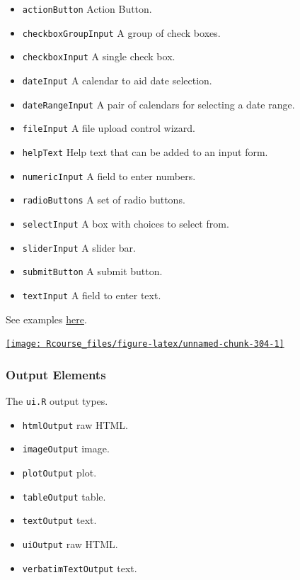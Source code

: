 \documentclass[]{book}
\providecommand{\tightlist}{%
  \setlength{\itemsep}{0pt}\setlength{\parskip}{0pt}}
\theoremstyle{definition}
\theoremstyle{definition}
\theoremstyle{definition}
\theoremstyle{remark}
\begin{document}
\begin{itemize}
\tightlist
\item
  \texttt{actionButton} Action Button.
\item
  \texttt{checkboxGroupInput} A group of check boxes.
\item
  \texttt{checkboxInput} A single check box.
\item
  \texttt{dateInput} A calendar to aid date selection.
\item
  \texttt{dateRangeInput} A pair of calendars for selecting a date
  range.
\item
  \texttt{fileInput} A file upload control wizard.
\item
  \texttt{helpText} Help text that can be added to an input form.
\item
  \texttt{numericInput} A field to enter numbers.
\item
  \texttt{radioButtons} A set of radio buttons.
\item
  \texttt{selectInput} A box with choices to select from.
\item
  \texttt{sliderInput} A slider bar.
\item
  \texttt{submitButton} A submit button.
\item
  \texttt{textInput} A field to enter text.
\end{itemize}

See examples
\href{https://shiny.rstudio.com/gallery/widget-gallery.html}{here}.

\href{https://shiny.rstudio.com/gallery/widget-gallery.html}{\texttt{[image: Rcourse\_files/figure-latex/unnamed-chunk-304-1]} }

\subsubsection{Output Elements}\label{output-elements}

The \texttt{ui.R} output types.

\begin{itemize}
\tightlist
\item
  \texttt{htmlOutput} raw HTML.
\item
  \texttt{imageOutput} image.
\item
  \texttt{plotOutput} plot.
\item
  \texttt{tableOutput} table.
\item
  \texttt{textOutput} text.
\item
  \texttt{uiOutput} raw HTML.
\item
  \texttt{verbatimTextOutput} text.
\end{itemize}
\end{document}
